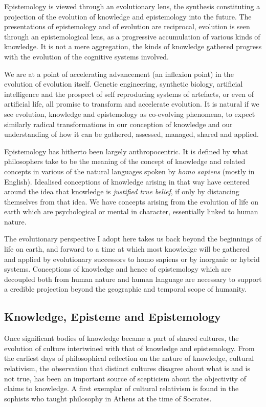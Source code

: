\documentclass[10pt,titlepage]{book}
\begin{document}
Epistemology is viewed through an evolutionary lens, the synthesis constituting a projection of the evolution of knowledge and epistemology into the future.
The presentations of epistemology and of evolution are reciprocal,
evolution is seen through an epistemological lens, as a progressive accumulation of various kinds of knowledge.
It is not a mere aggregation, the kinds of knowledge gathered progress with the evolution of the cognitive systems involved.

 We are at a point of accelerating advancement (an inflexion point) in the evolution of evolution itself.
Genetic engineering, synthetic biology, artificial intelligence and the prospect of self reproducing systems of artefacts, or even of artificial life, all promise to transform and accelerate evolution.
It is natural if we see evolution, knowledge and epistemology as co-evolving phenomena, to expect similarly radical transformations in our conception of knowledge and our understanding of how it can be gathered, assessed, managed, shared and applied.

Epistemology has hitherto been largely anthropocentric.
It is defined by what philosophers take to be the meaning of the concept of knowledge and related concepts in various of the natural languages spoken by \emph{homo sapiens} (mostly in English).
Idealised conceptions of knowledge arising in that way have centered around the idea that knowledge is \emph{justified true belief}, if only by distancing themselves from that idea.
We have concepts arising from the evolution of life on earth which are psychological or mental in character, essentially linked to human nature.

The evolutionary perspective I adopt here takes us back beyond the beginnings of life on earth, and forward to a time at which most knowledge will be gathered and applied by evolutionary successors to homo sapiens or by inorganic or hybrid systems.
Conceptions of knowledge and hence of epistemology which are decoupled both from human nature and human language are necessary to support a credible projection beyond the geographic and temporal scope of humanity.

\subsection{Knowledge, Episteme and Epistemology}

Once significant bodies of knowledge became a part of shared cultures, the evolution of culture intertwined with that of knowledge and epistemology.
From the earliest days of philosophical reflection on the nature of knowledge, cultural relativism, the observation that distinct cultures disagree about what is and is not true, has been an important source of scepticism about the objectivity of claims to knowledge.
A first exemplar of cultural relativism is found in the sophists who taught philosophy in Athens at the time of Socrates.
\end{document}
